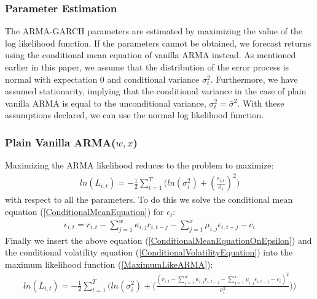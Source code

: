 \subsubsection{Parameter Estimation}

The ARMA-GARCH parameters are estimated by maximizing the value of the log likelihood function. If the parameters cannot be obtained, we forecast returns using the conditional mean equation of vanilla ARMA instead. As mentioned earlier in this paper, we assume that the distribution of the error process is normal with expectation 0 and conditional variance ${\sigma_t^2}$. Furthermore, we have assumed stationarity, implying that the conditional variance in the case of plain vanilla ARMA is equal to the unconditional variance, ${\sigma_t^2=\bar\sigma^2}$. With these assumptions declared, we can use the normal log likelihood function.

\subsubsection{Plain Vanilla ARMA($w,x$)}

Maximizing the ARMA likelihood reduces to the problem to maximize:
\begin{align} 
    ln(L_{i,t})=-\frac{1}{2}\sum_{t=1}^T\bigg( ln(\sigma_{i}^2)+(\frac{\epsilon_{i,t}}{\sigma_i})^2\bigg)  \label{MaximumLikeARMA}
\end{align}
with respect to all the parameters. To do this we solve the conditional mean equation (\ref{ConditionalMeanEquation}) for $\epsilon_t$:
\begin{align}
     \epsilon_{i,t}=r_{i,t}-\sum_{j=1}^w\kappa_{i,j} r_{i,t-j}-\sum_{j=1}^x\mu_{i,j} \epsilon_{i,t-j}-c_i \label{ConditionalMeanEquationOnEpsilon}
\end{align}
Finally we insert the above equation (\ref{ConditionalMeanEquationOnEpsilon}) and the conditional volatility equation (\ref{ConditionalVolatilityEquation}) into the maximum likelihood function (\ref{MaximumLikeARMA}):
\begin{align} 
    ln(L_{i,t})=-\frac{1}{2}\sum_{t=1}^T\Bigg( ln(\sigma_i^2)+\Big(\frac{(r_{i,t}-\sum_{j=1}^w\kappa_{i,j} r_{i,t-j}-\sum_{j=1}^x\mu_{i,j} \epsilon_{i,t-j}-c_i)^2}{\sigma_i^2}\Big)\Bigg)  \label{fullMaximumLikeARMA}
\end{align}


